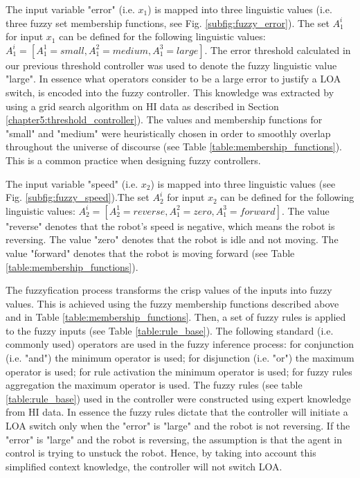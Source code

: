 \documentclass[a4paper,12pt,oneside,openright]{bhamthesis}
\begin{document}
The input variable "error" (i.e. $x_1$) is mapped into three linguistic values (i.e. three fuzzy set membership functions, see Fig. \ref{subfig:fuzzy_error}). The set $A_1^i$ for input $x_1$ can be defined for the following linguistic values: $A_1^i = [A_1^1 = small, A_1^2 = medium, A_1^3 = large]$. The error threshold calculated in our previous threshold controller was used to denote the fuzzy linguistic value "large". In essence what operators consider to be a large error to justify a LOA switch, is encoded into the fuzzy controller. This knowledge was extracted by using a grid search algorithm on HI data as described in Section \ref{chapter5:threshold_controller}). The values and membership functions for "small" and "medium" were heuristically chosen in order to smoothly overlap throughout the universe of discourse (see Table \ref{table:membership_functions}). This is a common practice when designing fuzzy controllers. 

The input variable "speed" (i.e. $x_2$) is mapped into three linguistic values (see Fig. \ref{subfig:fuzzy_speed}).The set $A_2^i$ for input $x_2$ can be defined for the following linguistic values: $A_2^i = [A_2^1 = reverse, A_1^2 = zero, A_1^3 = forward]$. The value "reverse" denotes that the robot's speed is negative, which means the robot is reversing. The value "zero" denotes that the robot is idle and not moving. The value "forward" denotes that the robot is moving forward (see Table \ref{table:membership_functions}).

The fuzzyfication process transforms the crisp values of the inputs into fuzzy values. This is achieved using the fuzzy membership functions described above and in Table \ref{table:membership_functions}. Then, a set of fuzzy rules is applied to the fuzzy inputs (see Table \ref{table:rule_base}). The following standard (i.e. commonly used) operators are used in the fuzzy inference process: for conjunction (i.e. "and") the minimum operator is used; for disjunction (i.e. "or") the maximum operator is used; for rule activation the minimum operator is used; for fuzzy rules aggregation the maximum operator is used. The fuzzy rules (see table \ref{table:rule_base}) used in the controller were constructed using expert knowledge from HI data. In essence the fuzzy rules dictate that the controller will initiate a LOA switch only when the "error" is "large" and the robot is not reversing. If the "error" is "large" and the robot is reversing, the assumption is that the agent in control is trying to unstuck the robot. Hence, by taking into account this simplified context knowledge, the controller will not switch LOA.
\end{document}
